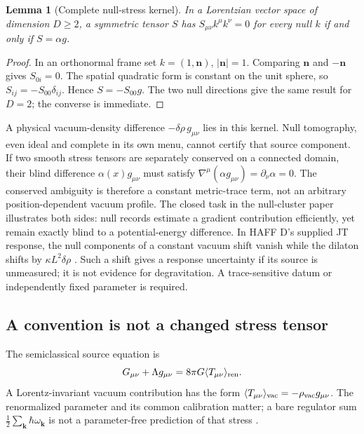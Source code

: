 \documentclass[12pt,a4paper]{article}
\newtheorem{lemma}[theorem]{Lemma}
\theoremstyle{definition}
\begin{document}
\begin{lemma}[Complete null-stress kernel]
\label{lem:null-trace}
In a Lorentzian vector space of dimension $D\geq2$, a symmetric tensor
$S$ has $S_{\mu\nu}k^\mu k^\nu=0$ for every null $k$ if and only if
$S=\alpha g$.
\end{lemma}
\begin{proof}
In an orthonormal frame set $k=(1,\mathbf n)$, $|\mathbf n|=1$.
Comparing $\mathbf n$ and $-\mathbf n$ gives $S_{0i}=0$. The spatial
quadratic form is constant on the unit sphere, so
$S_{ij}=-S_{00}\delta_{ij}$. Hence $S=-S_{00}g$. The two null
directions give the same result for $D=2$; the converse is immediate.
\end{proof}

A physical vacuum-density difference
$-\delta\rho\,g_{\mu\nu}$ lies in this kernel. Null tomography, even
ideal and complete in its own menu, cannot certify that source component.
If two smooth stress tensors are separately conserved on a connected
domain, their blind difference $\alpha(x)g_{\mu\nu}$ must satisfy
$\nabla^\mu(\alpha g_{\mu\nu})=\partial_\nu\alpha=0$.
The conserved ambiguity is therefore a constant metric-trace term,
not an arbitrary position-dependent vacuum profile.
The closed task in the null-cluster paper \cite{Liu2026NullCluster}
illustrates both sides: null records estimate a gradient contribution
efficiently, yet remain exactly blind to a potential-energy difference.
In HAFF D's supplied JT response, the null components of a constant
vacuum shift vanish while the dilaton shifts by
$\kappa L^2\delta\rho$ \cite{Liu2026HAFFD}. Such a shift gives a
response uncertainty if its source is unmeasured; it is not evidence for
degravitation. A trace-sensitive datum or independently fixed parameter
is required.

\subsection{A convention is not a changed stress tensor}

The semiclassical source equation is
\begin{equation}
 G_{\mu\nu}+\Lambda g_{\mu\nu}
       =8\pi G\langle T_{\mu\nu}\rangle_{\rm ren}.
\end{equation}
A Lorentz-invariant vacuum contribution has the form
$\langle T_{\mu\nu}\rangle_{\rm vac}=-\rho_{\rm vac}g_{\mu\nu}$.
The renormalized parameter and its common calibration matter; a bare
regulator sum $\tfrac12\sum_{\mathbf k}\hbar\omega_{\mathbf k}$ is not
a parameter-free prediction of that stress \cite{Weinberg1989,Wald1977}.
\end{document}
